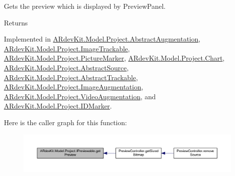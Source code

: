 Gets the preview which is displayed by Preview\-Panel. 

\begin{DoxyReturn}{Returns}

\end{DoxyReturn}


Implemented in \hyperlink{class_a_rdev_kit_1_1_model_1_1_project_1_1_abstract_augmentation_a627330061b5df53ece5646e1cf83ff0f}{A\-Rdev\-Kit.\-Model.\-Project.\-Abstract\-Augmentation}, \hyperlink{class_a_rdev_kit_1_1_model_1_1_project_1_1_image_trackable_a96e42ce5c75d50a49b617d8eb8f87b99}{A\-Rdev\-Kit.\-Model.\-Project.\-Image\-Trackable}, \hyperlink{class_a_rdev_kit_1_1_model_1_1_project_1_1_picture_marker_a9d608a1d9abb84c8109b7f34efffc658}{A\-Rdev\-Kit.\-Model.\-Project.\-Picture\-Marker}, \hyperlink{class_a_rdev_kit_1_1_model_1_1_project_1_1_chart_aab1b49aedaba3798818abd14c69918e8}{A\-Rdev\-Kit.\-Model.\-Project.\-Chart}, \hyperlink{class_a_rdev_kit_1_1_model_1_1_project_1_1_abstract_source_abd9f742efb27a1fca992f6627c0421e4}{A\-Rdev\-Kit.\-Model.\-Project.\-Abstract\-Source}, \hyperlink{class_a_rdev_kit_1_1_model_1_1_project_1_1_abstract_trackable_ab4d8a1902c82fe7a1d385d5688f92bd8}{A\-Rdev\-Kit.\-Model.\-Project.\-Abstract\-Trackable}, \hyperlink{class_a_rdev_kit_1_1_model_1_1_project_1_1_image_augmentation_a76230c0eb40c317bab23b37c27ea3a39}{A\-Rdev\-Kit.\-Model.\-Project.\-Image\-Augmentation}, \hyperlink{class_a_rdev_kit_1_1_model_1_1_project_1_1_video_augmentation_a3d5968ace1fe7b6becfc10b60f573631}{A\-Rdev\-Kit.\-Model.\-Project.\-Video\-Augmentation}, and \hyperlink{class_a_rdev_kit_1_1_model_1_1_project_1_1_i_d_marker_a4533a46611ee75747a5cf96f3fc2586c}{A\-Rdev\-Kit.\-Model.\-Project.\-I\-D\-Marker}.



Here is the caller graph for this function\-:
\nopagebreak
\begin{figure}[H]
\begin{center}
\leavevmode
\includegraphics[width=350pt]{interface_a_rdev_kit_1_1_model_1_1_project_1_1_i_previewable_a7cbcbb20929f4f1b6db3321ed2e83070_icgraph}
\end{center}
\end{figure}


